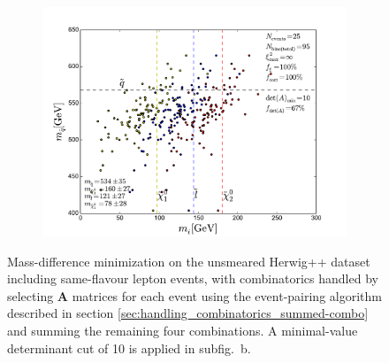 \documentclass[twoside,english]{uiofysmaster}
\begin{document}
\begin{figure}[hbt]
	\begin{subfigure}[b]{0.6\textwidth}
		\includegraphics[width=\textwidth]{figures/improving_combinatorics/herwigpp-OSFL_nosmear_detAcut10_A_matrix_algorithm_4combosum_TMP.pdf}
		\caption{ }
		\label{fig:event-pair-A-selection_4combosum-OSFL_b} 
	\end{subfigure}
	\caption{Mass-difference minimization on the unsmeared Herwig++ dataset including same-flavour lepton events, with combinatorics handled by selecting $\mathbf{A}$ matrices for each event using the event-pairing algorithm described in section \ref{sec:handling_combinatorics_summed-combo} and summing the remaining four combinations. A minimal-value determinant cut of 10 is applied in subfig.\ b.}
	\label{fig:event-pair-A-selection_4combosum-OSFL}
\end{figure}
\end{document}
